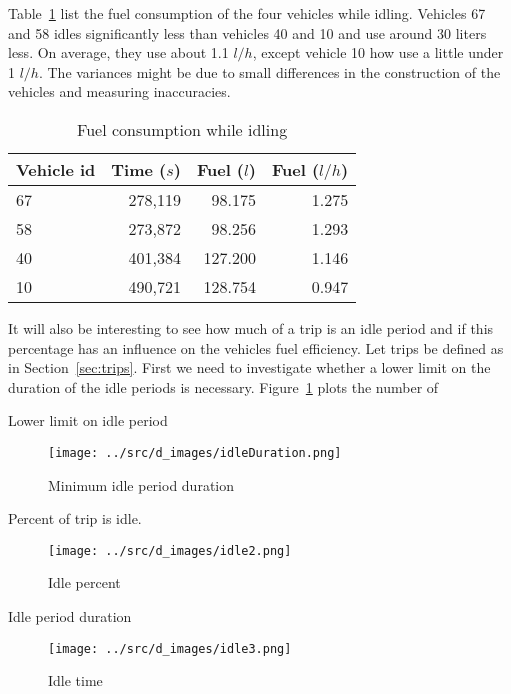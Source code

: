 Table~\ref{tb:idleFuelConsumption} list the fuel consumption of the four vehicles while idling.
Vehicles 67 and 58 idles significantly less than vehicles 40 and 10 and use around 30 liters less.
On average, they use about 1.1 $l/h$, except vehicle 10 how use a little under 1 $l/h$.
The variances might be due to small differences in the construction of the vehicles and measuring inaccuracies.
\begin{table}
\centering
\begin{tabular}{l|r|r|r}
Vehicle id & Time ($s$) & Fuel ($l$) &  Fuel ($l/h$)\\\hline
67 & 278,119 & 98.175 & 1.275\\\hline
58 & 273,872 & 98.256 & 1.293\\\hline
40 & 401,384 & 127.200 & 1.146\\\hline
10 & 490,721 & 128.754 & 0.947
\end{tabular}
\caption{Fuel consumption while idling}
\label{tb:idleFuelConsumption}
\end{table}

It will also be interesting to see how much of a trip is an idle period and if this percentage has an influence on the vehicles fuel efficiency.
Let trips be defined as in Section~\ref{sec:trips}.
First we need to investigate whether a lower limit on the duration of the idle periods is necessary.
Figure~\ref{fig:idleDuration} plots the number of 

Lower limit on idle period
\begin{figure}[htb]%
\centering
\texttt{[image: ../src/d\_images/idleDuration.png]}
\caption{Minimum idle period duration}
\label{fig:idleDuration}
\end{figure}

Percent of trip is idle.
\begin{figure}[htb]%
\centering
\texttt{[image: ../src/d\_images/idle2.png]}
\caption{Idle percent}
\label{fig:idlePercent}
\end{figure}

Idle period duration 
\begin{figure}[htb]%
\centering
\texttt{[image: ../src/d\_images/idle3.png]}
\caption{Idle time}
\label{fig:idleTime}
\end{figure}
